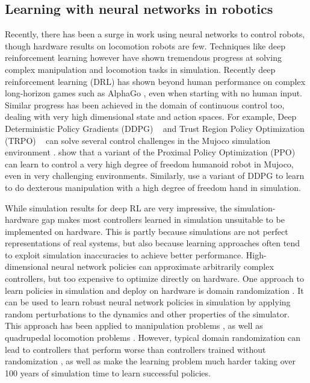 
\subsection{Learning with neural networks in robotics}

Recently, there has been a surge in work using neural networks to control robots, though hardware results on locomotion robots are few. Techniques like deep reinforcement learning however have shown tremendous progress at solving complex manipulation and locomotion tasks in simulation. Recently deep reinforcement learning (DRL) has shown beyond human performance on complex long-horizon games such as AlphaGo \cite{silver2016mastering}, even when starting with no human input. Similar progress has been achieved in the domain of continuous control too, dealing with very high dimensional state and action spaces. For example, Deep Deterministic Policy Gradients (DDPG) ~\cite{lillicrap2015continuous} and Trust Region Policy Optimization  (TRPO) ~\cite{schulman2015trust} can solve several control challenges in the Mujoco simulation environment \cite{todorov2012mujoco}. \cite{heess2017emergence} show that a variant of the Proximal Policy Optimization (PPO) \cite{schulman2017proximal} can learn to control a very high degree of freedom humanoid robot in Mujoco, even in very challenging environments. Similarly, \cite{rajeswaran2017towards} use a variant of DDPG to learn to do dexterous manipulation with a high degree of freedom hand in simulation.

While simulation results for deep RL are very impressive, the simulation-hardware gap makes most controllers learned in simulation unsuitable to be implemented on hardware. This is partly because simulations are not perfect representations of real systems, but also because learning approaches often tend to exploit simulation inaccuracies to achieve better performance. High-dimensional neural network policies can approximate arbitrarily complex controllers, but too expensive to optimize directly on hardware. One approach to learn policies in simulation and deploy on hardware is domain randomization \cite{mordatch2015ensemble}. It can be used to learn robust neural network policies in simulation by applying random perturbations to the dynamics and other properties of the simulator. This approach has been applied to manipulation problems \cite{peng2017sim}, as well as quadrupedal locomotion problems \cite{tan2018sim}. However, typical domain randomization can lead to controllers that perform worse than controllers trained without randomization \cite{tan2018sim}, as well as make the learning problem much harder \cite{2018arXiv180800177O} taking over 100 years of simulation time to learn successful policies.   

